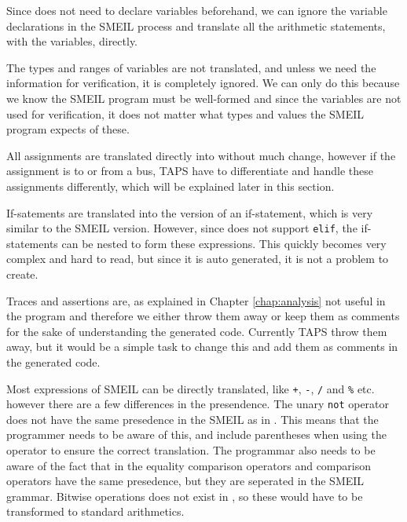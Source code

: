 Since \cspm{} does not need to declare variables beforehand, we can ignore the variable declarations in the SMEIL process and translate all the arithmetic statements, with the variables, directly.


The types and ranges of variables are not translated, and unless we need the information for verification, it is completely ignored. We can only do this because we know the SMEIL program must be well-formed and since the variables are not used for verification, it does not matter what types and values the SMEIL program expects of these.

All assignments are translated directly into \cspm{} without much change, however if the assignment is to or from a bus, TAPS have to differentiate and handle these assignments differently, which will be explained later in this section.

If-satements are translated into the \cspm{} version of an if-statement, which is very similar to the SMEIL version. However, since \cspm{} does not support \texttt{elif}, the \cspm{} if-statements can be nested to form these expressions. This quickly becomes very complex and hard to read, but since it is auto generated, it is not a problem to create.


Traces and assertions are, as explained in Chapter \ref{chap:analysis} not useful in the \cspm{} program and therefore we either throw them away or keep them as comments for the sake of understanding the generated code. Currently TAPS throw them away, but it would be a simple task to change this and add them as comments in the generated \cspm{} code.

Most expressions of SMEIL can be directly translated, like \texttt{+}, \texttt{-}, \texttt{/} and \texttt{\%} etc. however there are a few differences in the presendence. The unary \texttt{not} operator does not have the same presedence in the SMEIL as in \cspm{}. This means that the programmer needs to be aware of this, and include parentheses when using the operator to ensure the correct translation. The programmar also needs to be aware of the fact that in \cspm{} the equality comparison operators and comparison operators have the same presedence, but they are seperated in the SMEIL grammar.
Bitwise operations does not exist in \cspm{}, so these would have to be transformed to standard arithmetics. %

